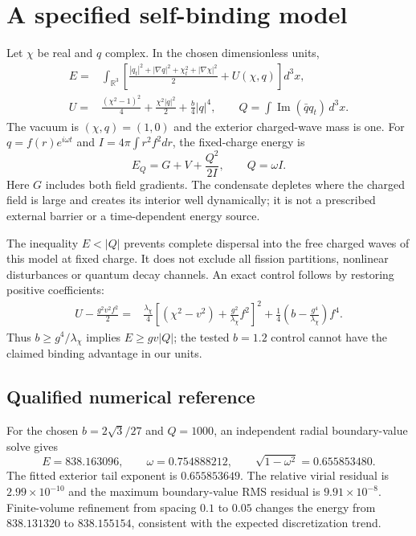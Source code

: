 \documentclass[11pt]{article}
\begin{document}
\section{A specified self-binding model}
Let $\chi$ be real and $q$ complex. In the chosen dimensionless units,
\begin{align}
 E={}&\int_{\mathbb R^3}\left[
 \frac{|q_t|^2+|\nabla q|^2+\chi_t^2+|\nabla\chi|^2}{2}
 +U(\chi,q)\right]d^3x,\\
 U={}&\frac{(\chi^2-1)^2}{4}+\frac{\chi^2|q|^2}{2}
 +\frac b4|q|^4,\qquad
 Q=\int\operatorname{Im}(\bar q q_t)\,d^3x.
\end{align}
The vacuum is $(\chi,q)=(1,0)$ and the exterior charged-wave mass is one.
For $q=f(r)e^{i\omega t}$ and
$I=4\pi\int r^2f^2dr$, the fixed-charge energy is
\begin{equation}
 E_Q=G+V+\frac{Q^2}{2I},\qquad Q=\omega I.
\end{equation}
Here $G$ includes both field gradients. The condensate depletes where the
charged field is large and creates its interior well dynamically; it is not
a prescribed external barrier or a time-dependent energy source.

The inequality $E<|Q|$ prevents complete dispersal into the free charged
waves of this model at fixed charge. It does not exclude all fission
partitions, nonlinear disturbances or quantum decay channels.
An exact control follows by restoring positive coefficients:
\begin{align}
 U-\frac{g^2v^2f^2}{2}
 ={}&\frac{\lambda_\chi}{4}
 \left[(\chi^2-v^2)+\frac{g^2}{\lambda_\chi}f^2\right]^2
 +\frac14\left(b-\frac{g^4}{\lambda_\chi}\right)f^4.
\end{align}
Thus $b\ge g^4/\lambda_\chi$ implies $E\ge gv|Q|$; the tested
$b=1.2$ control cannot have the claimed binding advantage in our units.

\subsection{Qualified numerical reference}
For the chosen $b=2\sqrt3/27$ and $Q=1000$, an independent radial
boundary-value solve gives
\begin{equation}
 E=838.163096,\qquad\omega=0.754888212,
 \qquad \sqrt{1-\omega^2}=0.655853480.
\end{equation}
The fitted exterior tail exponent is $0.655853649$. The relative virial
residual is $2.99\times10^{-10}$ and the maximum boundary-value RMS
residual is $9.91\times10^{-8}$. Finite-volume refinement from spacing
$0.1$ to $0.05$ changes the energy from $838.131320$ to $838.155154$,
consistent with the expected discretization trend.
\end{document}
